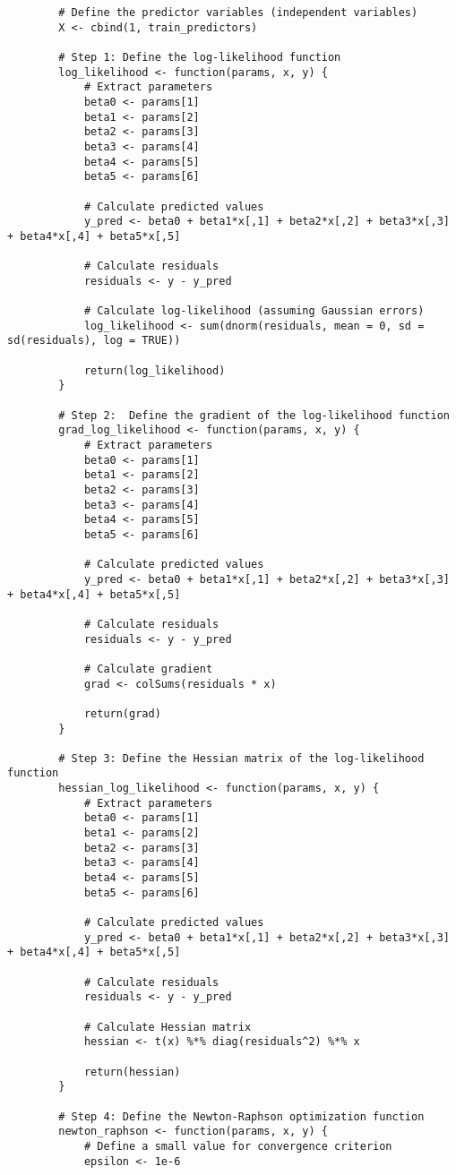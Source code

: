 \documentclass[12pt]{article}
\begin{document}
\begin{lstlisting}
		# Define the predictor variables (independent variables)
		X <- cbind(1, train_predictors)
		
		# Step 1: Define the log-likelihood function
		log_likelihood <- function(params, x, y) {
			# Extract parameters
			beta0 <- params[1]
			beta1 <- params[2]
			beta2 <- params[3]
			beta3 <- params[4]
			beta4 <- params[5]
			beta5 <- params[6]
			
			# Calculate predicted values
			y_pred <- beta0 + beta1*x[,1] + beta2*x[,2] + beta3*x[,3] + beta4*x[,4] + beta5*x[,5]
			
			# Calculate residuals
			residuals <- y - y_pred
			
			# Calculate log-likelihood (assuming Gaussian errors)
			log_likelihood <- sum(dnorm(residuals, mean = 0, sd = sd(residuals), log = TRUE))
			
			return(log_likelihood)
		}
		
		# Step 2:  Define the gradient of the log-likelihood function
		grad_log_likelihood <- function(params, x, y) {
			# Extract parameters
			beta0 <- params[1]
			beta1 <- params[2]
			beta2 <- params[3]
			beta3 <- params[4]
			beta4 <- params[5]
			beta5 <- params[6]
			
			# Calculate predicted values
			y_pred <- beta0 + beta1*x[,1] + beta2*x[,2] + beta3*x[,3] + beta4*x[,4] + beta5*x[,5]
			
			# Calculate residuals
			residuals <- y - y_pred
			
			# Calculate gradient
			grad <- colSums(residuals * x)
			
			return(grad)
		}
		
		# Step 3: Define the Hessian matrix of the log-likelihood function
		hessian_log_likelihood <- function(params, x, y) {
			# Extract parameters
			beta0 <- params[1]
			beta1 <- params[2]
			beta2 <- params[3]
			beta3 <- params[4]
			beta4 <- params[5]
			beta5 <- params[6]
			
			# Calculate predicted values
			y_pred <- beta0 + beta1*x[,1] + beta2*x[,2] + beta3*x[,3] + beta4*x[,4] + beta5*x[,5]
			
			# Calculate residuals
			residuals <- y - y_pred
			
			# Calculate Hessian matrix
			hessian <- t(x) %*% diag(residuals^2) %*% x
			
			return(hessian)
		}
		
		# Step 4: Define the Newton-Raphson optimization function
		newton_raphson <- function(params, x, y) {
			# Define a small value for convergence criterion
			epsilon <- 1e-6
			

\end{lstlisting}
\end{document}
